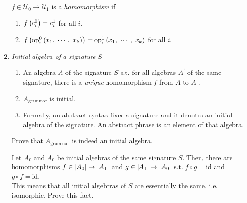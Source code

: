 \begin{enumerate}[label=\protect\circled{\arabic*}]
    $f \in \mathcal{U}_0 \rightarrow \mathcal{U}_1$ is a \emph{homomorphism} if
    \begin{enumerate}[label=(\roman*)]
      \item $f \left( c_i^0 \right) = c_i^1$ for all $i$.
      \item $f \left( \textrm{op}_i^0 \left( x_1,\; \cdots ,\; x_k \right) \right) =
        \textrm{op}_i^1 \left( x_1,\; \cdots ,\; x_k \right)$ for all $i$.
    \end{enumerate}

  \item
    \emph{Initial algebra of a signature} $S$
    \begin{enumerate}[label=(\roman*)]
      \item
        An algebra $A$ of the signature $S$ s.t. for all algebras $A^\prime$ of
        the same signature, there is a \emph{unique} homomorphism $f$ from $A$
        to $A^\prime$.
      \item
        $A_{\textrm{grammar}}$ is initial.
      \item
        Formally, an abstract syntax fixes a signature and it denotes an initial
        algebra of the signature. An abstract phrase is an element of that
        algebra.
    \end{enumerate}
    \begin{exercise}
      Prove that $A_{\textrm{grammar}}$ is indeed an initial algebra.
    \end{exercise}
    \begin{exercise}
      Let $A_0$ and $A_0$ be initial algebras of the same signature $S$. Then,
      there are homomorphisms $f \in \left\vert A_0 \right\vert \rightarrow \left\vert A_1 \right\vert$ and
      $g \in \left\vert A_1 \right\vert \rightarrow \left\vert A_0 \right\vert$ s.t. $f \circ g = \textrm{id}$ and
      $g \circ f = \textrm{id}$.\\
      This means that all initial algebrras of $S$ are essentially the same,
      i.e. isomorphic. Prove this fact.
    \end{exercise}

\end{enumerate}

